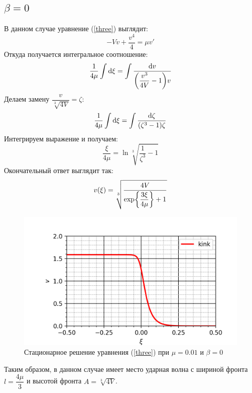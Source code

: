 \documentclass[titlepage]{article}
\begin{document}
\subsection{$\beta = 0$}
 В данном случае уравнение (\ref{three}) выглядит:
\begin{equation}
  -Vv + \dfrac{v^4}{4} = \mu v'
\end{equation}
Откуда получается интегральное соотношение:
\begin{equation}
\dfrac1{4\mu} \int \dd{\xi} = \int \dfrac{\dd{v}}{\qty(\dfrac{v^3}{4V} - 1)v}
\end{equation}
Делаем замену $\dfrac{v}{\sqrt[3]{4V}} = \zeta$:
\begin{equation}
\dfrac1{4\mu} \int \dd{\xi} = \int \dfrac{\dd{\zeta}}{\qty(\zeta^3 - 1)\zeta}
\end{equation}
Интегрируем выражение и получаем:
\begin{equation}
\dfrac{\xi}{4\mu} = \ln{\sqrt[3]{\dfrac{1}{\zeta^3} - 1}}
\end{equation}
Окончательный ответ выглядит так:
\begin{equation}
v\qty(\xi) = \sqrt[3]{\dfrac{4V}{\exp{\dfrac{3\xi}{4\mu}} + 1}}
\end{equation}
\begin{figure}[h]
 \includegraphics[width = 160 mm]{kink.png}
 \caption{Стационарное решение уравнения (\ref{three}) при $\mu=0.01$ и $\beta=0$}
\end{figure}
\par
Таким образом, в данном случае имеет место ударная волна с шириной фронта $l = \dfrac{4\mu}{3}$ и высотой фронта $A = \sqrt[3]{4V}$.
\end{document}
